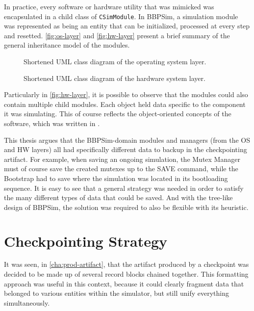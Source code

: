 {In practice, every software or hardware utility that was mimicked was encapsulated in a child class of \texttt{CSimModule}. In BBPSim, a simulation module was represented as being an entity that can be initialized, processed at every step and resetted. \autoref{fig:os-layer} and \autoref{fig:hw-layer} present a brief summary of the general inheritance model of the modules. 
\begin{figure}[htbp]
	\vspace{12pt}
	\centering
	\footnotesize
	
	\caption{Shortened UML class diagram of the operating system layer.}
	\label{fig:os-layer}
\end{figure}
\begin{figure}[htbp]
	\vspace{12pt}
	\centering
	\footnotesize
	
	\caption{Shortened UML class diagram of the hardware system layer.}
	\label{fig:hw-layer}
\end{figure}

Particularly in \autoref{fig:hw-layer}, it is possible to observe that the modules could also contain multiple child modules. Each object held data specific to the component it was simulating. This of course reflects the object-oriented concepts of the software, which was written in \Cpp.

This thesis argues that the BBPSim-domain modules and managers (from the OS and HW layers) all had specifically different data to backup in the checkpointing artifact. For example, when saving an ongoing simulation, the Mutex Manager must of course save the created mutexes up to the SAVE command, while the Bootstrap had to save where the simulation was located in its bootloading sequence. It is easy to see that a general strategy was needed in order to satisfy the many different types of data that could be saved. And with the tree-like design of BBPSim, the solution was required to also be flexible with its heuristic. 

\section{Checkpointing Strategy}
It was seen, in \autoref{cha:prod-artifact}, that the artifact produced by a checkpoint was decided to be made up of several record blocks chained together. This formatting approach was useful in this context, because it could clearly fragment data that belonged to various entities within the simulator, but still unify everything simultaneously. 

}
